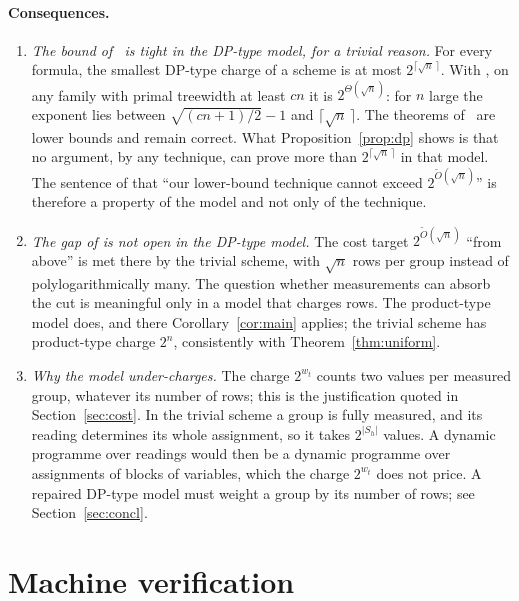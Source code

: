 \documentclass[11pt,a4paper]{article}
\theoremstyle{definition}
\theoremstyle{remark}
\begin{document}
\paragraph{Consequences.}
\begin{enumerate}
\item \emph{The bound of~\cite{DL} is tight in the DP-type model, for a trivial reason.} For
 every formula, the smallest DP-type charge of a scheme is at most
 $2^{\lceil\sqrt n\,\rceil}$. With \cite[Theorem~8.1]{DL}, on any family with primal
 treewidth at least $cn$ it is $2^{\Theta(\sqrt n)}$: for $n$ large the exponent lies
 between $\sqrt{(cn+1)/2}-1$ and $\lceil\sqrt n\,\rceil$. The theorems of~\cite{DL} are lower
 bounds and remain correct. What Proposition~\ref{prop:dp} shows is that no argument, by any
 technique, can prove more than $2^{\lceil\sqrt n\,\rceil}$ in that model. The sentence of
 \cite[Section~9]{DL} that ``our lower-bound technique cannot exceed
 $2^{\tilde O(\sqrt n)}$'' is therefore a property of the model and not only of the
 technique.
\item \emph{The gap of \cite[Section~9]{DL} is not open in the DP-type model.} The cost
 target $2^{\tilde O(\sqrt n)}$ ``from above'' is met there by the trivial scheme, with
 $\sqrt n$ rows per group instead of polylogarithmically many. The question whether
 measurements can absorb the cut is meaningful only in a model that charges rows. The
 product-type model does, and there Corollary~\ref{cor:main} applies; the trivial scheme has
 product-type charge $2^n$, consistently with Theorem~\ref{thm:uniform}.
\item \emph{Why the model under-charges.} The charge $2^{w_t}$ counts two values per measured
 group, whatever its number of rows; this is the justification quoted in
 Section~\ref{sec:cost}. In the trivial scheme a group is fully measured, and its reading
 determines its whole assignment, so it takes $2^{|S_h|}$ values. A dynamic programme over
 readings would then be a dynamic programme over assignments of blocks of variables, which
 the charge $2^{w_t}$ does not price. A repaired DP-type model must weight a group by its
 number of rows; see Section~\ref{sec:concl}.
\end{enumerate}

\section{Machine verification}\label{sec:lean}
\end{document}
